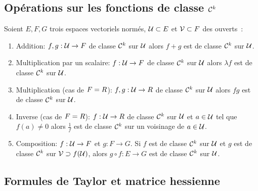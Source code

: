 
\sld{\vfill\pagebreak[5]}%
\subsection{Opérations sur les fonctions de classe $\mathcal{C}^k$}

\begin{proposition} Soient $E,F,G$ trois espaces vectoriels normés, $\mathcal{U} \subset E$ et $\mathcal{V} \subset F $ des ouverts~: 
	\begin{enumerate}[label=$(\roman*)$]
		\item Addition: $f,g: \mathcal{U} \to F$ de classe $\mathcal{C}^k$ sur $\mathcal{U}$ alors $f+g$ est de classe $\mathcal{C}^k$ sur $\mathcal{U}$. 
		\item Multiplication par un scalaire: $f:\mathcal{U}\to F$  de classe $\mathcal{C}^k$ sur $\mathcal{U}$ alors $\lambda f$ est  de classe $\mathcal{C}^k$ sur $\mathcal{U}$.
		\item Multiplication (cas de $F=R$): $f,g:\mathcal{U}\to R$  de classe $\mathcal{C}^k$ sur $\mathcal{U}$ alors $fg$ est  de classe $\mathcal{C}^k$ sur $\mathcal{U}$.
		\item Inverse (cas de $F=R$): $f:\mathcal{U}\to R$  de classe $\mathcal{C}^k$ sur $\mathcal{U}$ et $a \in \mathcal{U}$ tel que $f(a) \neq 0$ alors $\frac{1}{f}$ est  de classe $\mathcal{C}^k$ sur un voisinage de $a\in \mathcal{U}$.
		\item Composition: $f: \mathcal{U} \to F$ et $g: F \to G $. Si $f$ est  de classe $\mathcal{C}^k$ sur $\mathcal{U}$ et $g$ est  de classe $\mathcal{C}^k$ sur $\mathcal{V}\supset f( \mathcal{U})$, alors $g\circ f:E \to G$ est  de classe $\mathcal{C}^k$ sur $\mathcal{U}$. 
	\end{enumerate}
\end{proposition}


\sld{\vfill\pagebreak[5]}%
\subsection{Formules de Taylor et matrice hessienne}

